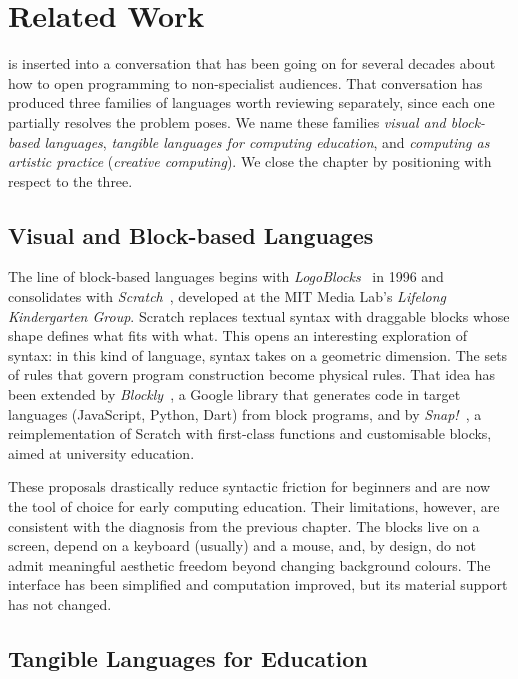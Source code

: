 
\chapter{Related Work}
\label{cha:related}

\sculpt is inserted into a conversation that has been going on for several decades about how to open programming to non-specialist audiences.
That conversation has produced three families of languages worth reviewing separately, since each one partially resolves the problem \sculpt poses.
We name these families \emph{visual and block-based languages}, \emph{tangible languages for computing education}, and \emph{computing as artistic practice} (\emph{creative computing}).
We close the chapter by positioning \sculpt with respect to the three.

\section{Visual and Block-based Languages}
\label{sec:related:visual}

The line of block-based languages begins with \emph{LogoBlocks}~\cite{begel96} in 1996 and consolidates with \emph{Scratch}~\cite{resnick09}, developed at the MIT Media Lab's \emph{Lifelong Kindergarten Group}.
Scratch replaces textual syntax with draggable blocks whose shape defines what fits with what.
This opens an interesting exploration of syntax: in this kind of language, syntax takes on a geometric dimension.
The sets of rules that govern program construction become physical rules.
That idea has been extended by \emph{Blockly}~\cite{fraser15}, a Google library that generates code in target languages (JavaScript, Python, Dart) from block programs, and by \emph{Snap!}~\cite{harvey13}, a reimplementation of Scratch with first-class functions and customisable blocks, aimed at university education.

These proposals drastically reduce syntactic friction for beginners and are now the tool of choice for early computing education.
Their limitations, however, are consistent with the diagnosis from the previous chapter.
The blocks live on a screen, depend on a keyboard (usually) and a mouse, and, by design, do not admit meaningful aesthetic freedom beyond changing background colours.
The interface has been simplified and computation improved, but its material support has not changed.

\section{Tangible Languages for Education}
\label{sec:related:tangible}

